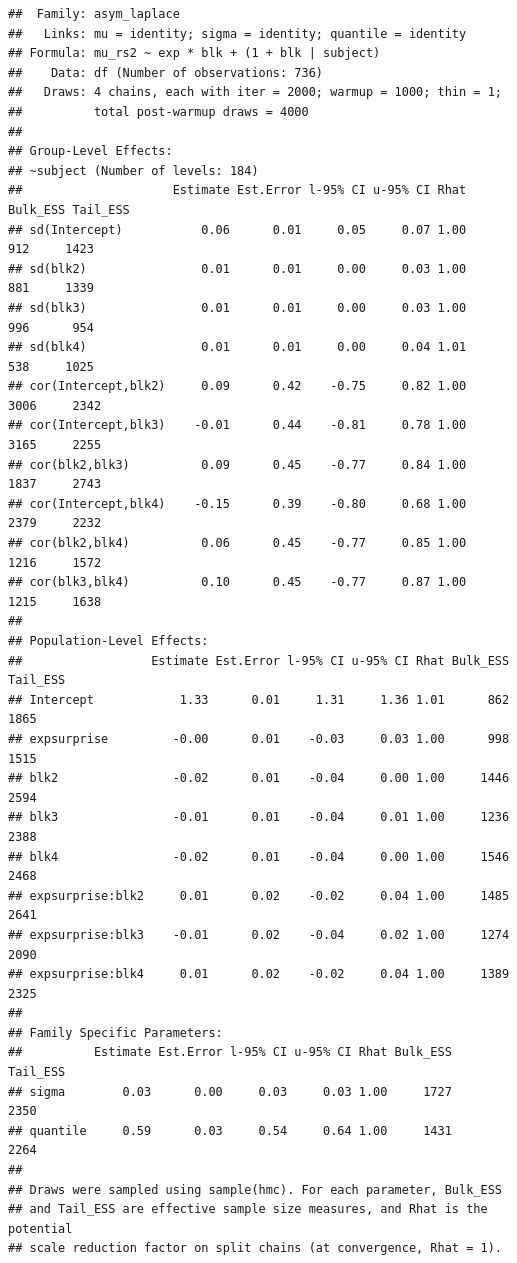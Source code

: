 \documentclass[
]{article}
\begin{document}
\begin{verbatim}
##  Family: asym_laplace 
##   Links: mu = identity; sigma = identity; quantile = identity 
## Formula: mu_rs2 ~ exp * blk + (1 + blk | subject) 
##    Data: df (Number of observations: 736) 
##   Draws: 4 chains, each with iter = 2000; warmup = 1000; thin = 1;
##          total post-warmup draws = 4000
## 
## Group-Level Effects: 
## ~subject (Number of levels: 184) 
##                     Estimate Est.Error l-95% CI u-95% CI Rhat Bulk_ESS Tail_ESS
## sd(Intercept)           0.06      0.01     0.05     0.07 1.00      912     1423
## sd(blk2)                0.01      0.01     0.00     0.03 1.00      881     1339
## sd(blk3)                0.01      0.01     0.00     0.03 1.00      996      954
## sd(blk4)                0.01      0.01     0.00     0.04 1.01      538     1025
## cor(Intercept,blk2)     0.09      0.42    -0.75     0.82 1.00     3006     2342
## cor(Intercept,blk3)    -0.01      0.44    -0.81     0.78 1.00     3165     2255
## cor(blk2,blk3)          0.09      0.45    -0.77     0.84 1.00     1837     2743
## cor(Intercept,blk4)    -0.15      0.39    -0.80     0.68 1.00     2379     2232
## cor(blk2,blk4)          0.06      0.45    -0.77     0.85 1.00     1216     1572
## cor(blk3,blk4)          0.10      0.45    -0.77     0.87 1.00     1215     1638
## 
## Population-Level Effects: 
##                  Estimate Est.Error l-95% CI u-95% CI Rhat Bulk_ESS Tail_ESS
## Intercept            1.33      0.01     1.31     1.36 1.01      862     1865
## expsurprise         -0.00      0.01    -0.03     0.03 1.00      998     1515
## blk2                -0.02      0.01    -0.04     0.00 1.00     1446     2594
## blk3                -0.01      0.01    -0.04     0.01 1.00     1236     2388
## blk4                -0.02      0.01    -0.04     0.00 1.00     1546     2468
## expsurprise:blk2     0.01      0.02    -0.02     0.04 1.00     1485     2641
## expsurprise:blk3    -0.01      0.02    -0.04     0.02 1.00     1274     2090
## expsurprise:blk4     0.01      0.02    -0.02     0.04 1.00     1389     2325
## 
## Family Specific Parameters: 
##          Estimate Est.Error l-95% CI u-95% CI Rhat Bulk_ESS Tail_ESS
## sigma        0.03      0.00     0.03     0.03 1.00     1727     2350
## quantile     0.59      0.03     0.54     0.64 1.00     1431     2264
## 
## Draws were sampled using sample(hmc). For each parameter, Bulk_ESS
## and Tail_ESS are effective sample size measures, and Rhat is the potential
## scale reduction factor on split chains (at convergence, Rhat = 1).
\end{verbatim}
\end{document}

